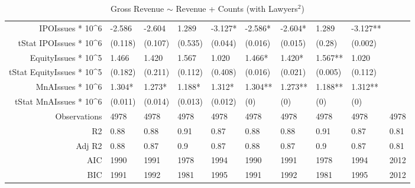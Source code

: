 \begin{table}[ht]
\begin{tabular}{rlllllllll}
  IPOIssues * 10^6 & -2.586 & -2.604 & 1.289 & -3.127* & -2.586* & -2.604* & 1.289 & -3.127** &  \\ 
  tStat IPOIssues * 10^6 & (0.118) & (0.107) & (0.535) & (0.044) & (0.016) & (0.015) & (0.28) & (0.002) &  \\ 
  EquityIssues * 10^5 & 1.466 & 1.420 & 1.567 & 1.020 & 1.466* & 1.420* & 1.567** & 1.020 &  \\ 
  tStat EquityIssues * 10^5 & (0.182) & (0.211) & (0.112) & (0.408) & (0.016) & (0.021) & (0.005) & (0.112) &  \\ 
  MnAIssues * 10^6 & 1.304* & 1.273* & 1.188* & 1.312* & 1.304** & 1.273** & 1.188** & 1.312** &  \\ 
  tStat MnAIssues * 10^6 & (0.011) & (0.014) & (0.013) & (0.012) & (0) & (0) & (0) & (0) &  \\ 
  Observations & 4978 & 4978 & 4978 & 4978 & 4978 & 4978 & 4978 & 4978 & 4978 \\ 
  R2 & 0.88 & 0.88 & 0.91 & 0.87 & 0.88 & 0.88 & 0.91 & 0.87 & 0.81 \\ 
  Adj R2 & 0.88 & 0.87 & 0.9 & 0.87 & 0.88 & 0.87 & 0.9 & 0.87 & 0.81 \\ 
  AIC & 1990 & 1991 & 1978 & 1994 & 1990 & 1991 & 1978 & 1994 & 2012 \\ 
  BIC & 1991 & 1992 & 1981 & 1995 & 1991 & 1992 & 1981 & 1995 & 2012 \\ 
   \hline
\end{tabular}
\caption{Gross Revenue $\sim$ Revenue + Counts (with Lawyers$^2$)} 
\end{table}
